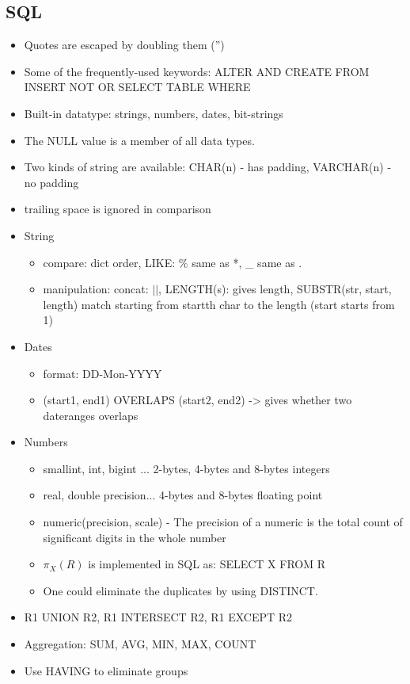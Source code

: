 \documentclass[a4paper]{scrartcl}
\begin{document}
  \subsection{SQL}
    \begin{itemize}
      \item Quotes are escaped by doubling them ('')
      \item Some of the frequently-used keywords: ALTER AND CREATE FROM INSERT NOT OR SELECT TABLE WHERE
      \item Built-in datatype: strings, numbers, dates, bit-strings
      \item The NULL value is a member of all data types.
      \item Two kinds of string are available: CHAR(n) - has padding, VARCHAR(n) - no padding
      \item trailing space is ignored in comparison
      \item String
      \begin{itemize}
        \item compare: dict order, LIKE: $\%$ same as *, \_ same as .
        \item manipulation: concat: $||$, LENGTH(s): gives length, SUBSTR(str, start, length) match starting from startth char to the length (start starts from 1)
      \end{itemize}
      \item Dates
      \begin{itemize}
        \item format: DD-Mon-YYYY
        \item (start1, end1) OVERLAPS (start2, end2) -> gives whether two dateranges overlaps
      \end{itemize}
      \item Numbers
      \begin{itemize}
        \item smallint, int, bigint ... 2-bytes, 4-bytes and 8-bytes integers
        \item real, double precision... 4-bytes and 8-bytes floating point
        \item numeric(precision, scale) - The precision of a numeric is the total count of significant digits
in the whole number
        \item $\pi_X(R)$ is implemented in SQL as: SELECT X FROM R
        \item One could eliminate the duplicates by using DISTINCT.
      \end{itemize}
      \item R1 UNION R2, R1 INTERSECT R2, R1 EXCEPT R2
      \item Aggregation: SUM, AVG, MIN, MAX, COUNT
      \item Use HAVING to eliminate groups
    \end{itemize}
\end{document}
